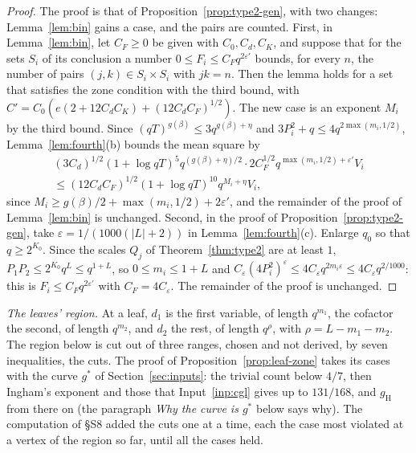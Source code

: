 \documentclass[11pt]{article}
\theoremstyle{definition}
\begin{document}
\begin{proof}
The proof is that of Proposition~\ref{prop:type2-gen}, with two changes: Lemma~\ref{lem:bin} gains a case, and the
pairs are counted. First, in Lemma~\ref{lem:bin}, let $C_F \ge 0$ be given with $C_0, C_d, C_K$, and suppose that for
the sets $S_i$ of its conclusion a number $0 \le F_i \le C_F q^{2\varepsilon'}$ bounds, for every $n$, the number of
pairs $(j, k) \in S_i \times S_i$ with $jk = n$. Then the lemma
holds for a set that satisfies the zone condition with the third bound, with $C' = C_0(e(2 + 12C_dC_K) +
(12C_dC_F)^{1/2})$. The new case is an exponent $M_i$ by the third bound. Since $(qT)^{g(\beta)} \le 3q^{g(\beta) +
\eta}$ and $3P_i^2 + q \le 4q^{2\max(m_i, 1/2)}$, Lemma~\ref{lem:fourth}(b) bounds the mean square by
\begin{multline*}
  (3C_d)^{1/2} (1 + \log qT)^5 q^{(g(\beta) + \eta)/2} \cdot 2C_F^{1/2} q^{\max(m_i, 1/2) + \varepsilon'} V_i \\
  \le (12C_dC_F)^{1/2} (1 + \log qT)^{10} q^{M_i + \eta} V_i,
\end{multline*}
since $M_i \ge g(\beta)/2 + \max(m_i, 1/2) + 2\varepsilon'$, and the remainder of the proof of Lemma~\ref{lem:bin} is
unchanged. Second, in the proof of Proposition~\ref{prop:type2-gen}, take $\varepsilon = 1/(1000(|L| + 2))$ in
Lemma~\ref{lem:fourth}(c). Enlarge $q_0$ so that $q \ge 2^{K_0}$. Since the scales $Q_j$ of
Theorem~\ref{thm:type2} are at least $1$, $P_1P_2 \le 2^{K_0} q^L \le q^{1 + L}$, so $0
\le m_i \le 1 + L$ and $C_\varepsilon (4P_i^2)^\varepsilon \le 4C_\varepsilon q^{2m_i\varepsilon} \le 4C_\varepsilon
q^{2/1000}$: this is $F_i \le C_F q^{2\varepsilon'}$ with $C_F = 4C_\varepsilon$. The remainder of the proof is
unchanged.
\end{proof}

\emph{The leaves' region.} At a leaf, $d_1$ is the first variable, of length $q^{m_1}$, the cofactor the second, of
length $q^{m_2}$, and $d_2$ the rest, of length $q^\rho$, with $\rho = L - m_1 - m_2$. The region below is cut out
of three ranges, chosen and not derived, by seven inequalities, the cuts. The proof of
Proposition~\ref{prop:leaf-zone} takes its cases with the curve $g^*$ of Section~\ref{sec:inputs}: the trivial count
below $4/7$, then Ingham's exponent and those that Input~\ref{inp:cgl} gives up to $131/168$, and $g_{\mathrm H}$ from
there on (the paragraph \emph{Why the curve is $g^*$} below says why). The computation of \S S8 added the cuts one at
a time, each the case most violated at a vertex of the region so far, until all the cases held.
\end{document}
